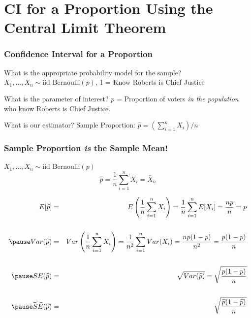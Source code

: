 \section{CI for a Proportion Using the Central Limit Theorem}
\begin{frame}
\frametitle{Confidence Interval for a Proportion}
	\begin{block}{What is the appropriate probability model for the sample?} 
$X_1, \hdots, X_n \sim \mbox{iid Bernoulli}(p)$, 1 = Know Roberts is Chief Justice
\end{block}


	\begin{block}{What is the parameter of interest?}
$p$ = Proportion of voters \emph{in the population} who know Roberts is Chief Justice.
\end{block}



\begin{block}{What is our estimator?} 
Sample Proportion: $\widehat{p} = (\sum_{i=1}^n X_i)/n$
\end{block}
\end{frame}
\begin{frame}
\frametitle{Sample Proportion \emph{is} the Sample Mean!}
\small
$X_1, \hdots, X_n \sim \mbox{iid Bernoulli}(p)$
		$$\widehat{p} = \frac{1}{n} \sum_{i=1}^n X_i = \bar{X}_n$$

\pause


	\begin{eqnarray*}
		E[\widehat{p}] &=&  E\left(\frac{1}{n}\sum_{i=1}^n X_i\right) =  \frac{1}{n} \sum_{i=1}^n E[X_i] =   \frac{np}{n} =  p\\ \\ \pause
		Var(\widehat{p}) &=&  Var\left(\frac{1}{n}\sum_{i=1}^n X_i\right) = \frac{1}{n^2} \sum_{i=1}^n Var(X_i) = \frac{n p(1-p)}{n^2} =  \frac{p(1-p)}{n} \\ \\  \pause
		SE(\widehat{p}) &=&  \sqrt{Var(\widehat{p})} =  \sqrt{\frac{p(1-p)}{n}} \\ \\ \pause
		\widehat{SE}(\widehat{p}) &=&  \sqrt{\frac{\widehat{p}(1-\widehat{p})}{n}}
	\end{eqnarray*}

\end{frame}
